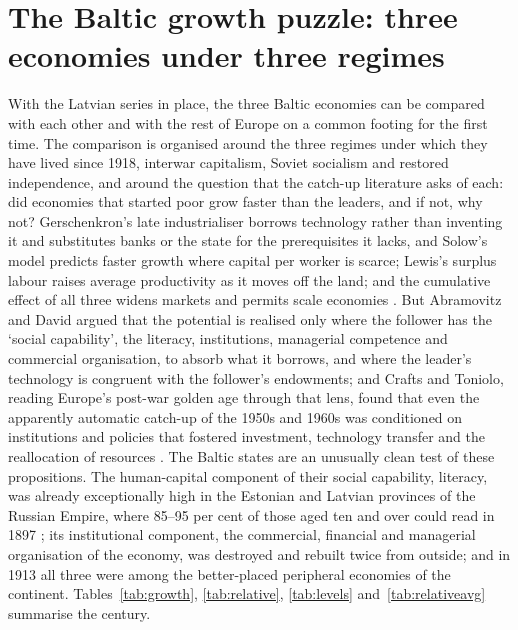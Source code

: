 \section{The Baltic growth puzzle: three economies under three regimes}
\label{sec:baltic}

With the Latvian series in place, the three Baltic economies can be compared with each other and with the rest of Europe on a common footing for the first time. The comparison is organised around the three regimes under which they have lived since 1918, interwar capitalism, Soviet socialism and restored independence, and around the question that the catch-up literature asks of each: did economies that started poor grow faster than the leaders, and if not, why not? Gerschenkron's late industrialiser borrows technology rather than inventing it and substitutes banks or the state for the prerequisites it lacks, and Solow's model predicts faster growth where capital per worker is scarce; Lewis's surplus labour raises average productivity as it moves off the land; and the cumulative effect of all three widens markets and permits scale economies \parencites[8, 14--20, 46--7]{gerschenkron1962}[70--1]{solow1956}{lewis1954}[22]{abramovitz_david1996}. But Abramovitz and David argued that the potential is realised only where the follower has the `social capability', the literacy, institutions, managerial competence and commercial organisation, to absorb what it borrows, and where the leader's technology is congruent with the follower's endowments; and Crafts and Toniolo, reading Europe's post-war golden age through that lens, found that even the apparently automatic catch-up of the 1950s and 1960s was conditioned on institutions and policies that fostered investment, technology transfer and the reallocation of resources \parencites[23--35]{abramovitz_david1996}[297--330]{craftstoniolo2010}. The Baltic states are an unusually clean test of these propositions. The human-capital component of their social capability, literacy, was already exceptionally high in the Estonian and Latvian provinces of the Russian Empire, where 85--95 per cent of those aged ten and over could read in 1897 \parencite[71]{raun_2017_literacy}; its institutional component, the commercial, financial and managerial organisation of the economy, was destroyed and rebuilt twice from outside; and in 1913 all three were among the better-placed peripheral economies of the continent. Tables~\ref{tab:growth}, \ref{tab:relative}, \ref{tab:levels} and~\ref{tab:relativeavg} summarise the century.

